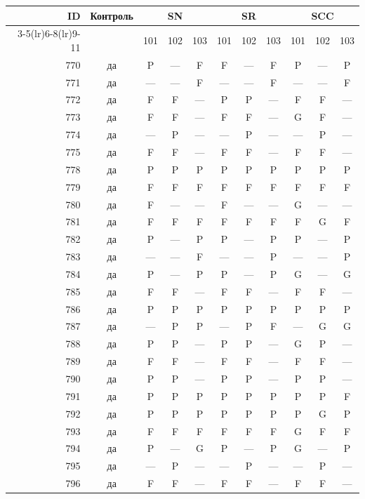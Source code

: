 \begin{table}[p]\centering\small
\begin{tabular*}{\textwidth}{@{\extracolsep{\fill}}rc*{9}{c}@{}}\toprule
ID & Контроль & \multicolumn{3}{c}{SN} & \multicolumn{3}{c}{SR} & \multicolumn{3}{c}{SCC}\\
\cmidrule(lr){3-5}\cmidrule(lr){6-8}\cmidrule(lr){9-11}
 & & 101 & 102 & 103 & 101 & 102 & 103 & 101 & 102 & 103\\\midrule
770 & да & P & — & F & F & — & F & P & — & P\\
771 & да & — & — & F & — & — & F & — & — & F\\
772 & да & F & F & — & P & P & — & F & F & —\\
773 & да & F & F & — & F & F & — & G & F & —\\
774 & да & — & P & — & — & P & — & — & P & —\\
775 & да & F & F & — & F & F & — & F & F & —\\
778 & да & P & P & P & P & P & P & P & P & P\\
779 & да & F & F & F & F & F & F & F & F & F\\
780 & да & F & — & — & F & — & — & G & — & —\\
781 & да & F & F & F & F & F & F & F & G & F\\
782 & да & P & — & P & P & — & P & P & — & P\\
783 & да & — & — & F & — & — & P & — & — & P\\
784 & да & P & — & P & P & — & P & G & — & G\\
785 & да & F & F & — & F & F & — & F & F & —\\
786 & да & P & P & P & P & P & P & P & P & P\\
787 & да & — & P & P & — & P & F & — & G & G\\
788 & да & P & P & — & P & P & — & G & P & —\\
789 & да & F & F & — & F & F & — & F & F & —\\
790 & да & P & P & — & P & P & — & P & P & —\\
791 & да & P & P & P & P & P & P & P & P & F\\
792 & да & P & P & P & P & P & P & P & G & P\\
793 & да & F & F & F & F & F & F & G & F & F\\
794 & да & P & — & G & P & — & P & G & — & P\\
795 & да & — & P & — & — & P & — & — & P & —\\
796 & да & F & F & — & F & F & — & F & F & —\\

\end{tabular*}
\end{table}
